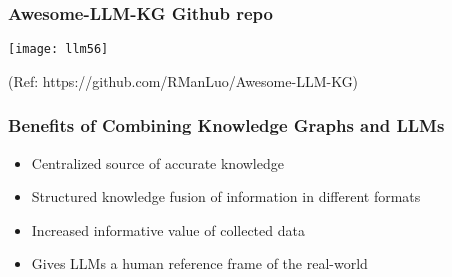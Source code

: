 \begin{frame}[fragile]\frametitle{Awesome-LLM-KG Github repo}

\begin{center}
\texttt{[image: llm56]}
\end{center}	

{\tiny (Ref: https://github.com/RManLuo/Awesome-LLM-KG)}

	
\end{frame}



\begin{frame}[fragile]\frametitle{Benefits of Combining Knowledge Graphs and LLMs}

\begin{itemize}
\item Centralized source of accurate knowledge
\item Structured knowledge fusion of information in different formats
\item Increased informative value of collected data
\item Gives LLMs a human reference frame of the real-world
\end{itemize}

\end{frame}


